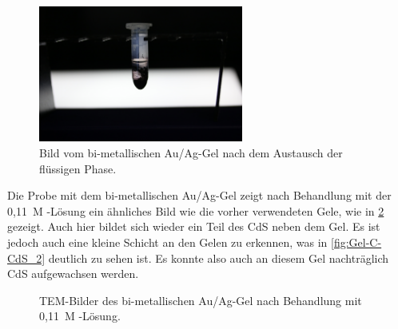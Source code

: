 		\begin{figure}[H]
			\centering
			\includegraphics[width=0.6\textwidth]{Bilder/Foto-Gel-cit} 	
			\caption{Bild vom bi-metallischen Au/Ag-Gel nach dem Austausch der flüssigen Phase.}
			\label{fig:Foto-Gel-cit}
		\end{figure}
	
		Die Probe mit dem bi-metallischen Au/Ag-Gel zeigt nach Behandlung mit der 0,11~M -Lösung ein ähnliches Bild wie die vorher verwendeten Gele, wie in \cref{fig:Gel-C-CdS} gezeigt.
		Auch hier bildet sich wieder ein Teil des CdS neben dem Gel.
		Es ist jedoch auch eine kleine Schicht an den Gelen zu erkennen, was in \cref{fig:Gel-C-CdS_2} deutlich zu sehen ist.
		Es konnte also auch an diesem Gel nachträglich CdS aufgewachsen werden.
		
		\begin{figure}[H]
			\centering
			\caption{TEM-Bilder des bi-metallischen Au/Ag-Gel nach Behandlung mit 0,11~M -Lösung.}
			\label{fig:Gel-C-CdS}
		\end{figure}
		
		 
		
		
		
		
	   
	
 
 